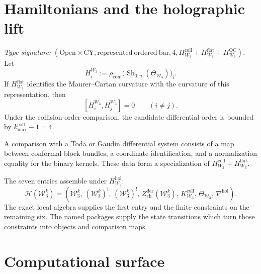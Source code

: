\section{Hamiltonians and the holographic lift}
\label{sec:w3hol-commuting-hamiltonians}

\begin{theorem}
\label{thm:w3hol-commuting-differentials}
\emph{Type signature:}
\((\mathrm{Open}\times\mathrm{CY},
\mathrm{represented\ ordered\ bar},4,
H_{W_3}^{\mathrm{coll}}+
H_{W_3}^{\mathrm{flat}}+
H_{W_3}^{\mathrm{OC}})\).
Let
\[
H_i^{W_3}
:=
\rho_{\mathrm{conf}}
\bigl(
\operatorname{Sh}_{0,n}(\Theta_{\mathcal W_3})
\bigr)_i.
\]
If \(H_{W_3}^{\mathrm{flat}}\) identifies the Maurer--Cartan curvature
with the curvature of this representation, then
\begin{equation}\label{eq:w3hol-commuting}
[H_i^{W_3},H_j^{W_3}]=0
\qquad(i\ne j).
\end{equation}
Under the collision-order comparison, the candidate differential
order is bounded by \(k_{\max}^{\mathrm{coll}}-1=4\).
\end{theorem}

\begin{remark}
\label{rem:w3hol-gz26}
A comparison with a Toda or Gaudin differential system consists of a
map between conformal-block bundles, a coordinate identification, and
a normalization equality for the binary kernels.  These data form a
specialization of
\(H_{W_3}^{\mathrm{coll}}+H_{W_3}^{\mathrm{flat}}\).
\end{remark}

The seven entries assemble under \(H_{W_3}^{\mathrm{hol}}\):
\[
\mathcal H(\mathcal W_3^k)
=
\left(
\mathcal W_3^k,\,
(\mathcal W_3^k)^{\mathrm i},\,
(\mathcal W_3^k)^!,\,
Z_{\mathrm{ch}}^{\mathrm{der}}(\mathcal W_3^k),\,
K_{\mathcal W_3}^{\mathrm{coll}},\,
\Theta_{\mathcal W_3},\,
\nabla^{\mathrm{hol}}
\right).
\]
The exact local algebra supplies the first entry and the finite
constraints on the remaining six.  The named packages supply the
state transitions which turn those constraints into objects and
comparison maps.

\section{Computational surface}
\label{sec:w3hol-verification}

